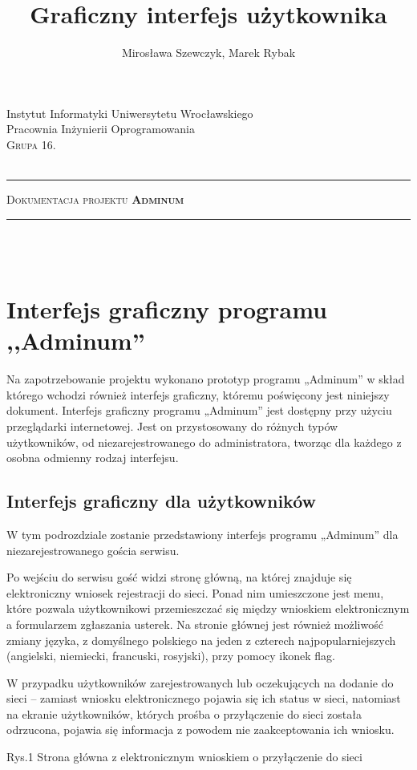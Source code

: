\documentclass[12pt,a4paper,notitlepage]{article}
\author{Mirosława Szewczyk, Marek Rybak}
\title{Graficzny interfejs użytkownika}
\makeatletter
\newcommand{\linia}{\rule{\linewidth}{0.4mm}}
\renewcommand{\maketitle}{\begin{titlepage}

    \vspace*{2cm}
\begin{center}\small        
        Instytut Informatyki Uniwersytetu Wrocławskiego\\
        Pracownia Inżynierii Oprogramowania\\
  \vspace{2cm}
        \normalsize \textsc{Grupa 16.}\\
        \normalsize \textsc{\@author}\\
\end{center}
    \vspace{3cm}
    \noindent\linia
    \begin{center}
        \LARGE \textsc{Dokumentacja projektu \textbf{Adminum}}\\       
        \linia
        \vspace{2cm}
        \LARGE \textsc{\@title}\\
      
        \vspace{1.5cm}
       \normalsize \@date\\


    \end{center}
  \end{titlepage}
}
\makeatother
\begin{document}
    \maketitle
\setcounter{page}{2}
    \tableofcontents
    \newpage
    \section{Interfejs graficzny programu ,,Adminum''}
Na zapotrzebowanie projektu wykonano prototyp programu „Adminum” w skład którego wchodzi również interfejs graficzny, któremu poświęcony jest niniejszy dokument.
Interfejs graficzny programu „Adminum” jest dostępny przy użyciu przeglądarki internetowej. Jest on przystosowany do różnych typów użytkowników, od niezarejestrowanego do administratora, tworząc dla każdego z osobna odmienny rodzaj interfejsu.
   \subsection{Interfejs graficzny dla użytkowników}
W tym podrozdziale zostanie przedstawiony interfejs programu „Adminum” dla niezarejestrowanego gościa serwisu.

Po wejściu do serwisu gość widzi stronę główną, na której znajduje się elektroniczny wniosek rejestracji do sieci. Ponad nim umieszczone jest menu, które pozwala użytkownikowi przemieszczać się między wnioskiem elektronicznym a formularzem zgłaszania usterek. Na stronie głównej jest również możliwość zmiany języka, z domyślnego polskiego na jeden z czterech najpopularniejszych (angielski, niemiecki, francuski, rosyjski), przy pomocy ikonek flag.

W przypadku użytkowników zarejestrowanych lub oczekujących na dodanie do sieci – zamiast wniosku elektronicznego pojawia się ich status w sieci, natomiast na ekranie użytkowników, których prośba o przyłączenie do sieci została odrzucona,  pojawia się informacja z powodem nie zaakceptowania ich wniosku.\\

\begin{center}Rys.1 Strona główna z elektronicznym wnioskiem o przyłączenie do sieci \end{center}
\end{document}

